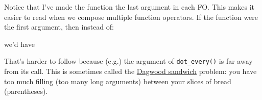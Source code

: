 \begin{Shaded}
\end{Shaded}

Notice that I've made the function the last argument in each FO. This
makes it easier to read when we compose multiple function operators. If
the function were the first argument, then instead of:

\begin{Shaded}
\begin{Highlighting}[]
\StringTok{ }\NormalTok{(}\NormalTok{, }\NormalTok{(}
\end{Highlighting}
\end{Shaded}

we'd have

\begin{Shaded}
\begin{Highlighting}[]
\StringTok{ }\NormalTok{(}\NormalTok{), }\NormalTok{)}
\end{Highlighting}
\end{Shaded}

That's harder to follow because (e.g.) the argument of
\texttt{dot\_every()} is far away from its call. This is sometimes
called the \href{http://en.wikipedia.org/wiki/Dagwood_sandwich}{Dagwood
sandwich} problem: you have too much filling (too many long arguments)
between your slices of bread (parentheses).


